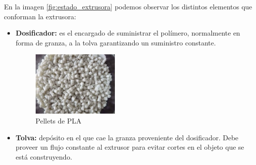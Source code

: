 En la imagen \ref{fig:estado_extrusora} podemos observar los distintos elementos que conforman la extrusora:
\begin{itemize}
    \item \textbf{Dosificador:} es el encargado de suministrar el polímero, normalmente en forma de granza, a la tolva garantizando un suministro constante. 
     \begin{figure}[H]
        \centering
        \includegraphics[width=0.4\textwidth]{images/PLA-Pellets.jpg}
        \caption{Pellets de PLA}
        \label{fig:Pellets_PLA}
    \end{figure}
    \item \textbf{Tolva:} depósito en el que cae la granza proveniente del dosificador. Debe proveer un flujo constante al extrusor para evitar cortes en el objeto que se está construyendo.
   

\end{itemize}
